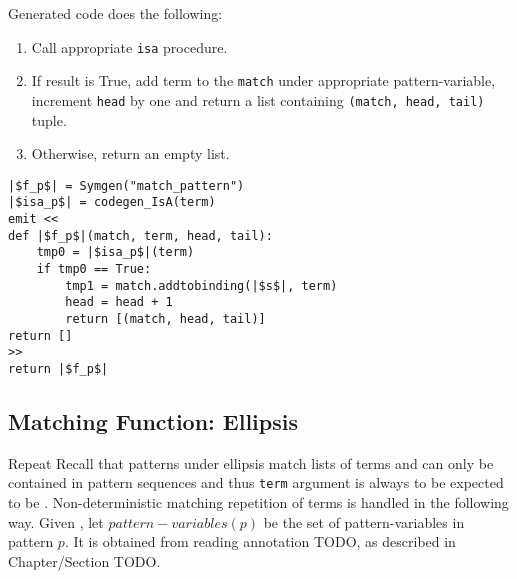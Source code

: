 Generated code does the following:

\begin{enumerate}
\item Call appropriate \texttt{isa} procedure. 
\item If result is True, add term to the \texttt{match} under appropriate pattern-variable, increment \texttt{head} by one and return a list containing \texttt{(match, head, tail)} tuple.
\item Otherwise, return an empty list.
\end{enumerate}


\begin{verbatim}
|$f_p$| = Symgen("match_pattern")
|$isa_p$| = codegen_IsA(term)
emit <<
def |$f_p$|(match, term, head, tail):
	tmp0 = |$isa_p$|(term)
	if tmp0 == True:
		tmp1 = match.addtobinding(|$s$|, term) 
		head = head + 1
		return [(match, head, tail)]
return []
>>
return |$f_p$|

\end{verbatim}

\subsection{Matching Function: Ellipsis}
Repeat Recall that patterns under ellipsis match lists of terms and can only be contained in pattern sequences and thus \texttt{term} argument is always to be expected to be \PatternSequence. Non-deterministic matching repetition of terms is handled in the following way. Given \Repeat, let $pattern-variables(p)$ be the set of pattern-variables in pattern $p$. It is obtained from reading annotation TODO, as described in Chapter/Section TODO. 

